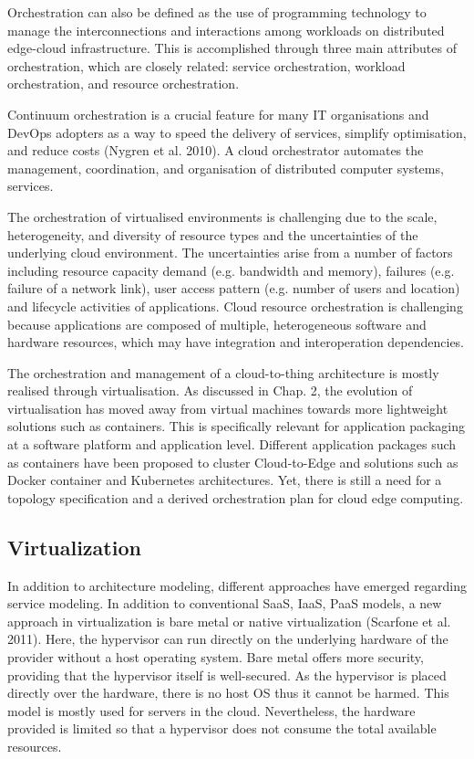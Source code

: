 \documentclass{ieeeaccess}
\begin{document}
Orchestration can also be defined as the use of programming technology to manage the interconnections and interactions among workloads on distributed edge-cloud infrastructure. This is accomplished through three main attributes of orchestration, which are closely related: service orchestration, workload orchestration, and resource orchestration. 

Continuum orchestration is a crucial feature for many IT organisations and DevOps adopters as a way to speed the delivery of services, simplify optimisation, and reduce costs (Nygren et al. 2010). A cloud orchestrator automates the management, coordination, and organisation of distributed computer systems, services. 

The orchestration of virtualised environments is challenging due to the scale, heterogeneity, and diversity of resource types and the uncertainties of the underlying cloud environment. The uncertainties arise from a number of factors including resource capacity demand (e.g. bandwidth and memory), failures (e.g. failure of a network link), user access pattern (e.g. number of users and location) and lifecycle activities of applications. Cloud resource orchestration is challenging because applications are composed of multiple, heterogeneous software and hardware resources, which may have integration and interoperation dependencies.

The orchestration and management of a cloud-to-thing architecture is mostly realised through virtualisation. As discussed in Chap. 2, the evolution of virtualisation has moved away from virtual machines towards more lightweight solutions such as containers. This is specifically relevant for application packaging at a software platform and application level. Different application packages such as containers have been proposed to cluster Cloud-to-Edge and solutions such as Docker container and Kubernetes architectures. Yet, there is still a need for a topology specification and a derived orchestration plan for cloud edge computing.

\subsection{Virtualization}

In addition to architecture modeling, different approaches have emerged regarding service modeling. In addition to conventional SaaS, IaaS, PaaS models, a new approach in virtualization is bare metal or native virtualization (Scarfone et al. 2011). Here, the hypervisor can run directly on the underlying hardware of the provider without a host operating system. Bare metal offers more security, providing that the hypervisor itself is well-secured. As the hypervisor is placed directly over the hardware, there is no host OS thus it cannot be harmed. This model is mostly used for servers in the cloud. Nevertheless, the hardware provided is limited so that a hypervisor does not consume the total available resources.
\end{document}
